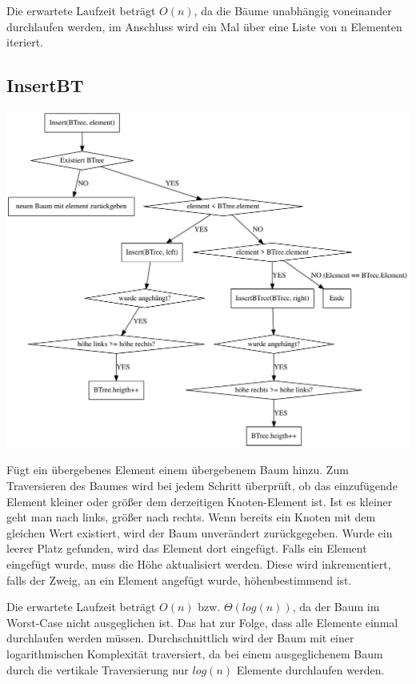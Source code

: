 \documentclass[11pt]{article}
\begin{document}
    Die erwartete Laufzeit beträgt
    \begin{math}
        O(n)
    \end{math},
    da die Bäume unabhängig voneinander durchlaufen werden, im Anschluss wird
    ein Mal über eine Liste von n Elementen iteriert.

    \subsection{InsertBT}\label{subsec:insertbt}

    \begin{center}
        \includegraphics[width=1\columnwidth] {insert}
    \end{center}

    Fügt ein übergebenes Element einem übergebenem Baum hinzu.
    Zum Traversieren des Baumes wird bei jedem Schritt überprüft,
    ob das einzufügende Element kleiner oder größer dem derzeitigen Knoten-Element ist.
    Ist es kleiner geht man nach links, größer nach rechts.
    Wenn bereits ein Knoten mit dem gleichen Wert existiert, wird der Baum
    unverändert zurückgegeben.
    Wurde ein leerer Platz gefunden, wird das Element dort eingefügt.
    Falls ein Element eingefügt wurde, muss die Höhe aktualisiert werden.
    Diese wird inkrementiert, falls der Zweig, an ein Element angefügt wurde,
    höhenbestimmend ist.


    Die erwartete Laufzeit beträgt
    \begin{math}
        O(n)
    \end {math}
    bzw.
    \begin{math}
        \Theta (log (n))
    \end{math},
    da der Baum im Worst-Case nicht ausgeglichen ist.
    Das hat zur Folge, dass alle Elemente einmal durchlaufen werden müssen.
    Durchschnittlich wird der Baum mit einer logarithmischen Komplexität
    traversiert, da bei einem ausgeglichenem Baum durch die vertikale
    Traversierung nur
    \begin{math}
        log (n)
    \end{math}
    Elemente durchlaufen werden.
\end{document}

